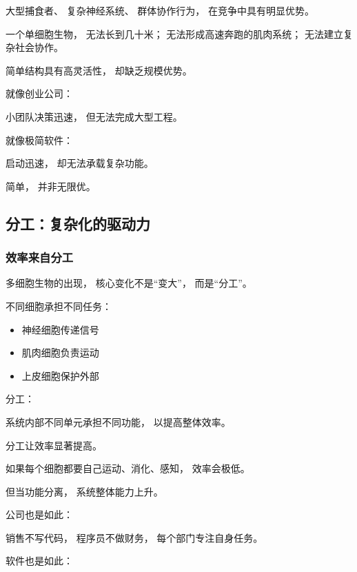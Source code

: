 \documentclass[openany, a4paper, 12pt]{book}
\begin{document}
大型捕食者、
复杂神经系统、
群体协作行为，
在竞争中具有明显优势。

\begin{examplebox}
	一个单细胞生物，
	无法长到几十米；
	无法形成高速奔跑的肌肉系统；
	无法建立复杂社会协作。
\end{examplebox}

简单结构具有高灵活性，
却缺乏规模优势。

就像创业公司：

小团队决策迅速，
但无法完成大型工程。

就像极简软件：

启动迅速，
却无法承载复杂功能。

简单，
并非无限优。

\subsection{分工：复杂化的驱动力}

\subsubsection{效率来自分工}

多细胞生物的出现，
核心变化不是“变大”，
而是“分工”。

不同细胞承担不同任务：

\begin{itemize}
	\item 神经细胞传递信号
	\item 肌肉细胞负责运动
	\item 上皮细胞保护外部
\end{itemize}

\begin{definitionbox}
	分工：
	
	系统内部不同单元承担不同功能，
	以提高整体效率。
\end{definitionbox}

分工让效率显著提高。

\begin{examplebox}
	如果每个细胞都要自己运动、消化、感知，
	效率会极低。
	
	但当功能分离，
	系统整体能力上升。
\end{examplebox}

公司也是如此：

销售不写代码，
程序员不做财务，
每个部门专注自身任务。

软件也是如此：
\end{document}
